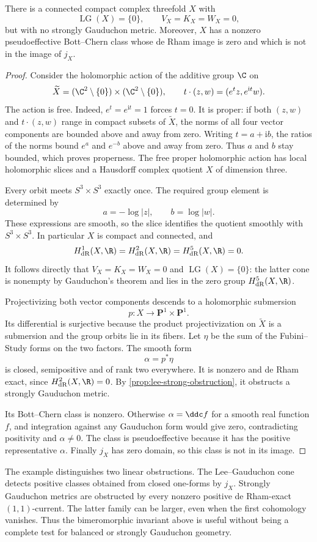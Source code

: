 \begin{example}\label{ex:lee-calabi-eckmann}
There is a connected compact complex threefold $X$ with
\[
 \operatorname{LG}(X)=\{0\},\qquad V_X=K_X=W_X=0,
\]
but with no strongly Gauduchon metric. Moreover, $X$ has a nonzero pseudoeffective Bott--Chern class whose de Rham image is zero and which is not in the image of $j_X$.
\end{example}
\begin{proof}
Consider the holomorphic action of the additive group $\C$ on
\[
 \widetilde X=(\C^2\setminus\{0\})\times(\C^2\setminus\{0\}),
 \qquad
 t\cdot(z,w)=(e^t z,e^{\mathrm i t}w).
\]
The action is free. Indeed, $e^t=e^{\mathrm i t}=1$ forces $t=0$. It is proper: if both $(z,w)$ and $t\cdot(z,w)$ range in compact subsets of $\widetilde X$, the norms of all four vector components are bounded above and away from zero. Writing $t=a+\mathrm i b$, the ratios of the norms bound $e^a$ and $e^{-b}$ above and away from zero. Thus $a$ and $b$ stay bounded, which proves properness. The free proper holomorphic action has local holomorphic slices and a Hausdorff complex quotient $X$ of dimension three.

Every orbit meets $S^3\times S^3$ exactly once. The required group element is determined by
\[
 a=-\log|z|,\qquad b=\log|w|.
\]
These expressions are smooth, so the slice identifies the quotient smoothly with $S^3\times S^3$. In particular $X$ is compact and connected, and
\[
 H^1_{\mathrm{dR}}(X,\R)=H^2_{\mathrm{dR}}(X,\R)
 =H^5_{\mathrm{dR}}(X,\R)=0.
\]
It follows directly that $V_X=K_X=W_X=0$ and $\operatorname{LG}(X)=\{0\}$: the latter cone is nonempty by Gauduchon's theorem and lies in the zero group $H^5_{\mathrm{dR}}(X,\R)$.

Projectivizing both vector components descends to a holomorphic submersion
\[
 p:X\longrightarrow\mathbf P^1\times\mathbf P^1.
\]
Its differential is surjective because the product projectivization on $\widetilde X$ is a submersion and the group orbits lie in its fibers. Let $\eta$ be the sum of the Fubini--Study forms on the two factors. The smooth form
\[
 \alpha=p^*\eta
\]
is closed, semipositive and of rank two everywhere. It is nonzero and de Rham exact, since $H^2_{\mathrm{dR}}(X,\R)=0$. By \cref{prop:lee-strong-obstruction}, it obstructs a strongly Gauduchon metric.

Its Bott--Chern class is nonzero. Otherwise $\alpha=\ddc f$ for a smooth real function $f$, and integration against any Gauduchon form would give zero, contradicting positivity and $\alpha\ne0$. The class is pseudoeffective because it has the positive representative $\alpha$. Finally $j_X$ has zero domain, so this class is not in its image.
\end{proof}

The example distinguishes two linear obstructions. The Lee--Gauduchon cone detects positive classes obtained from closed one-forms by $j_X$. Strongly Gauduchon metrics are obstructed by every nonzero positive de Rham-exact $(1,1)$-current. The latter family can be larger, even when the first cohomology vanishes. Thus the bimeromorphic invariant above is useful without being a complete test for balanced or strongly Gauduchon geometry.
